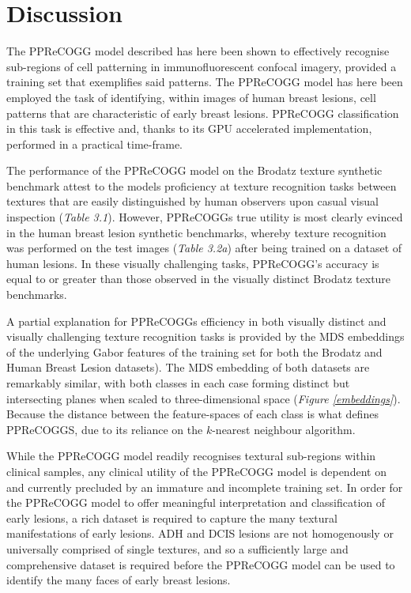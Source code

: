 \section{Discussion}

The PPReCOGG model described has here been shown to effectively recognise sub-regions of cell patterning in immunofluorescent confocal imagery, provided a training set that exemplifies said patterns. The PPReCOGG model has here been employed the task of identifying, within images of human breast lesions, cell patterns that are characteristic of early breast lesions. PPReCOGG classification in this task is effective and, thanks to its GPU accelerated implementation, performed in a practical time-frame.\par

The performance of the PPReCOGG model on the Brodatz texture synthetic benchmark attest to the models proficiency at texture recognition tasks between textures that are easily distinguished by human observers upon casual visual inspection (\textit{Table 3.1}). However, PPReCOGGs true utility is most clearly evinced in the human breast lesion synthetic benchmarks, whereby texture recognition was performed on the test images (\textit{Table 3.2a}) after being trained on a dataset of human lesions. In these visually challenging tasks, PPReCOGG's accuracy is equal to or greater than those observed in the visually distinct Brodatz texture benchmarks.\par 

A partial explanation for PPReCOGGs efficiency in both visually distinct and visually challenging texture recognition tasks is provided by the MDS embeddings of the underlying Gabor features of the training set for both the Brodatz and Human Breast Lesion datasets). The MDS embedding of both datasets are remarkably similar, with both classes in each case forming distinct but intersecting planes when scaled to three-dimensional space (\textit{Figure \ref{embeddings}}). Because the distance between the feature-spaces of each class is what defines PPReCOGGS, due to its reliance on the $k$-nearest neighbour algorithm.\par

While the PPReCOGG model readily recognises textural sub-regions within clinical samples, any clinical utility of the PPReCOGG model is dependent on and currently precluded by an immature and incomplete training set. In order for the PPReCOGG model to offer meaningful interpretation and classification of early lesions, a rich dataset is required to capture the many textural manifestations of early lesions. ADH and DCIS lesions are not homogenously or universally comprised of single textures, and so a sufficiently large and comprehensive dataset is required before the PPReCOGG model can be used to identify the many faces of early breast lesions. \par

